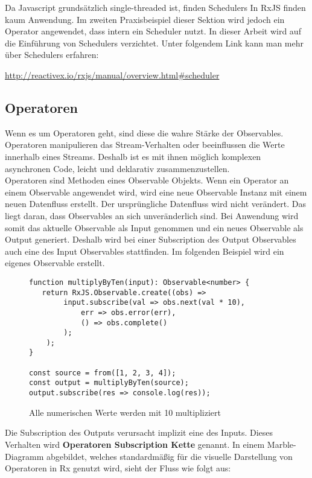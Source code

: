 \noindent
Da Javascript grundsätzlich single-threaded ist, finden Schedulers In RxJS finden kaum Anwendung. Im zweiten Praxisbeispiel dieser Sektion wird jedoch ein Operator angewendet, dass intern ein Scheduler nutzt. In dieser Arbeit wird auf die Einführung von Schedulers verzichtet. Unter folgendem Link kann man mehr über Schedulers erfahren:

\begin{center}
    \url{http://reactivex.io/rxjs/manual/overview.html#scheduler}
\end{center}

\subsection{Operatoren}

Wenn es um Operatoren geht, sind diese die wahre Stärke der Observables. Operatoren manipulieren das Stream-Verhalten oder beeinflussen die Werte innerhalb eines Streams. Deshalb ist es mit ihnen möglich komplexen asynchronen Code, leicht und deklarativ zusammenzustellen.\\

\noindent
Operatoren sind Methoden eines Observable Objekts. Wenn ein Operator an einem Observable angewendet wird, wird eine neue Observable Instanz mit einem neuen Datenfluss erstellt. Der ursprüngliche Datenfluss wird nicht verändert. Das liegt daran, dass Observables an sich unveränderlich sind. Bei Anwendung wird somit das aktuelle Observable als Input genommen und ein neues Observable als Output generiert. Deshalb wird bei einer Subscription des Output Observables auch eine des Input Observables stattfinden. Im folgenden Beispiel wird ein eigenes Observable erstellt.

\begin{figure}[H]
\begin{lstlisting}[basicstyle=\small]
function multiplyByTen(input): Observable<number> {
   return RxJS.Observable.create((obs) =>
        input.subscribe(val => obs.next(val * 10),
            err => obs.error(err),
            () => obs.complete()
        );
    );
}

const source = from([1, 2, 3, 4]);
const output = multiplyByTen(source);
output.subscribe(res => console.log(res));
\end{lstlisting}
\caption{Alle numerischen Werte werden mit 10 multipliziert}
\end{figure}

\noindent
Die Subscription des Outputs verursacht implizit eine des Inputs. Dieses Verhalten wird \textbf{Operatoren Subscription Kette} genannt. In einem Marble-Diagramm abgebildet, welches standardmäßig für die visuelle Darstellung von Operatoren in Rx genutzt wird, sieht der Fluss wie folgt aus:


